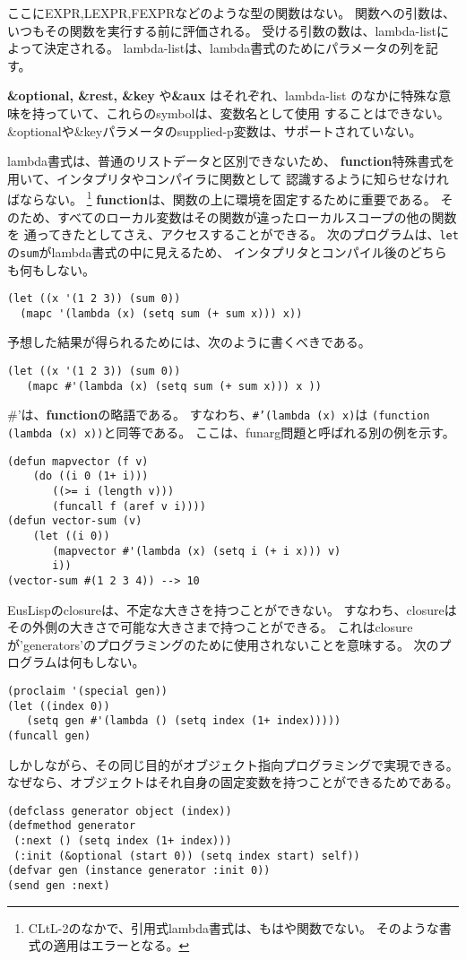 ここにEXPR,LEXPR,FEXPRなどのような型の関数はない。
関数への引数は、いつもその関数を実行する前に評価される。
受ける引数の数は、lambda-listによって決定される。
lambda-listは、lambda書式のためにパラメータの列を記す。

{\bf \&optional, \&rest, \&key }や{\bf \&aux} はそれぞれ、lambda-list
のなかに特殊な意味を持っていて、これらのsymbolは、変数名として使用
することはできない。
\&optionalや\&keyパラメータのsupplied-p変数は、サポートされていない。

lambda書式は、普通のリストデータと区別できないため、
{\bf function}特殊書式を用いて、インタプリタやコンパイラに関数として
認識するように知らせなければならない。
\footnote{CLtL-2のなかで、引用式lambda書式は、もはや関数でない。
そのような書式の適用はエラーとなる。}
{\bf function}は、関数の上に環境を固定するために重要である。
そのため、すべてのローカル変数はその関数が違ったローカルスコープの他の関数を
通ってきたとしてさえ、アクセスすることができる。
次のプログラムは、{\tt let}の{\tt sum}がlambda書式の中に見えるため、
インタプリタとコンパイル後のどちらも何もしない。


\begin{verbatim}
(let ((x '(1 2 3)) (sum 0))
  (mapc '(lambda (x) (setq sum (+ sum x))) x))
\end{verbatim}

予想した結果が得られるためには、次のように書くべきである。
\begin{verbatim}
(let ((x '(1 2 3)) (sum 0))
   (mapc #'(lambda (x) (setq sum (+ sum x))) x ))
\end{verbatim}

\#'は、{\bf function}の略語である。
すなわち、{\tt \#'(lambda (x) x)}は
{\tt (function (lambda (x) x))}と同等である。
ここは、funarg問題と呼ばれる別の例を示す。

\begin{verbatim}
(defun mapvector (f v)
    (do ((i 0 (1+ i)))
       ((>= i (length v)))
       (funcall f (aref v i))))
(defun vector-sum (v)
    (let ((i 0))
       (mapvector #'(lambda (x) (setq i (+ i x))) v)
       i))
(vector-sum #(1 2 3 4)) --> 10 
\end{verbatim}

EusLispのclosureは、不定な大きさを持つことができない。
すなわち、closureはその外側の大きさで可能な大きさまで持つことができる。
これはclosureが'generators'のプログラミングのために使用されないことを意味する。
次のプログラムは何もしない。

\begin{verbatim}
(proclaim '(special gen))
(let ((index 0))
   (setq gen #'(lambda () (setq index (1+ index)))))
(funcall gen)
\end{verbatim}

しかしながら、その同じ目的がオブジェクト指向プログラミングで実現できる。
なぜなら、オブジェクトはそれ自身の固定変数を持つことができるためである。
\begin{verbatim}
(defclass generator object (index))
(defmethod generator
 (:next () (setq index (1+ index)))
 (:init (&optional (start 0)) (setq index start) self))
(defvar gen (instance generator :init 0))
(send gen :next)
\end{verbatim}
\newpage
